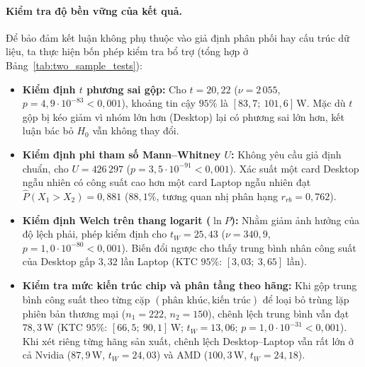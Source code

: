 \paragraph{Kiểm tra độ bền vững của kết quả.}
Để bảo đảm kết luận không phụ thuộc vào giả định phân phối hay cấu trúc dữ liệu, ta thực hiện bốn phép kiểm tra bổ trợ (tổng hợp ở Bảng~\ref{tab:two_sample_tests}):
\begin{itemize}
  \item \textbf{Kiểm định $t$ phương sai gộp:} Cho $t = 20{,}22$ ($\nu = 2\,055$, $p = 4{,}9 \cdot 10^{-83} < 0{,}001$), khoảng tin cậy $95\%$ là $[83{,}7;\ 101{,}6]$\,W. Mặc dù $t$ gộp bị kéo giảm vì nhóm lớn hơn (Desktop) lại có phương sai lớn hơn, kết luận bác bỏ $H_0$ vẫn không thay đổi.
  \item \textbf{Kiểm định phi tham số Mann--Whitney $U$:} Không yêu cầu giả định chuẩn, cho $U = 426\,297$ ($p = 3{,}5 \cdot 10^{-91} < 0{,}001$). Xác suất một card Desktop ngẫu nhiên có công suất cao hơn một card Laptop ngẫu nhiên đạt $\hat{P}(X_1 > X_2) = 0{,}881$ ($88{,}1\%$, tương quan nhị phân hạng $r_{rb} = 0{,}762$).
  \item \textbf{Kiểm định Welch trên thang logarit ($\ln P$):} Nhằm giảm ảnh hưởng của độ lệch phải, phép kiểm định cho $t_W = 25{,}43$ ($\nu = 340{,}9$, $p = 1{,}0 \cdot 10^{-80} < 0{,}001$). Biến đổi ngược cho thấy trung bình nhân công suất của Desktop gấp $3{,}32$ lần Laptop (KTC $95\%$: $[3{,}03;\ 3{,}65]$ lần).
  \item \textbf{Kiểm tra mức kiến trúc chip và phân tầng theo hãng:} Khi gộp trung bình công suất theo từng cặp $(\text{phân khúc}, \text{kiến trúc})$ để loại bỏ trùng lặp phiên bản thương mại ($n_1 = 222$, $n_2 = 150$), chênh lệch trung bình vẫn đạt $78{,}3$\,W (KTC $95\%$: $[66{,}5;\ 90{,}1]$\,W; $t_W = 13{,}06$; $p = 1{,}0 \cdot 10^{-31} < 0{,}001$). Khi xét riêng từng hãng sản xuất, chênh lệch Desktop--Laptop vẫn rất lớn ở cả Nvidia ($87{,}9$\,W, $t_W = 24{,}03$) và AMD ($100{,}3$\,W, $t_W = 24{,}18$).
\end{itemize}

